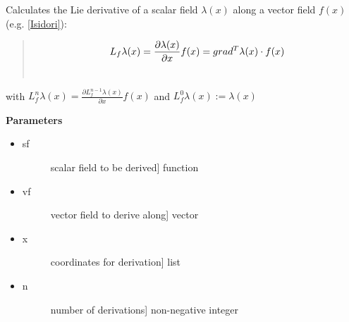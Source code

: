 \documentclass[letterpaper,10pt,english]{sphinxmanual}
\begin{document}
\begin{fulllineitems}
\label{pycontroltools:lietools.lietools.lie_deriv}
Calculates the Lie derivative of a scalar field $\lambda(x)$ along
a vector field $f(x)$ (e.g. {\hyperref[pycontroltools_sources:isidori]{{[}Isidori{]}}}):
\begin{quote}
\begin{gather}
\begin{split}L_f\lambda(x)   = \frac{ \partial{\lambda(x)} }{ \partial{x} }f(x)
                = grad^{T}\lambda(x)\cdot f(x)\end{split}\notag\\\begin{split}\end{split}\notag
\end{gather}\end{quote}

with $L_f^n\lambda(x)=\frac{ \partial{L_f^{n-1}\lambda(x)} }
{ \partial{x} }f(x)$ and $L_f^{0}\lambda(x) := \lambda(x)$

\textbf{Parameters}
\begin{itemize}
\item {} \begin{description}
\item[{sf}] \leavevmode{[}scalar field to be derived{]}
function

\end{description}

\item {} \begin{description}
\item[{vf}] \leavevmode{[}vector field to derive along{]}
vector

\end{description}

\item {} \begin{description}
\item[{x}] \leavevmode{[}coordinates for derivation{]}
list

\end{description}

\item {} \begin{description}
\item[{n}] \leavevmode{[}number of derivations{]}
non-negative integer

\end{description}


\end{itemize}
\end{fulllineitems}
\end{document}

